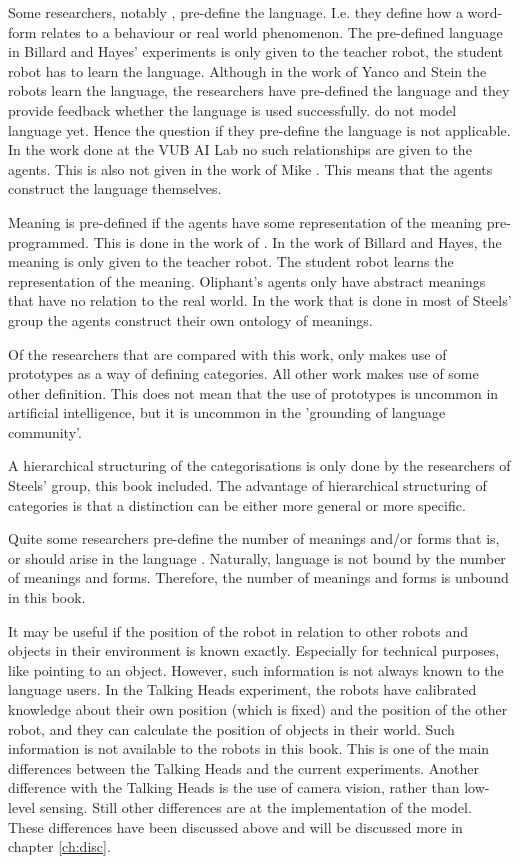 Some researchers, notably \citep{billard:1997a,cangelosiparisi:1998,yancostein}, pre-define the language. I.e. they define how a word-form relates to a behaviour or real world phenomenon. The pre-defined language in Billard and Hayes' experiments is only given to the teacher robot, the student robot has to learn the language. Although in the work of Yanco and Stein the robots learn the language, the researchers have pre-defined the language and they provide feedback whether the language is used successfully. \citet{rosenstein:1998a} do not model language yet. Hence the question if they pre-define the language is not applicable. In the work done at the VUB AI Lab no such relationships are given to the agents. This is also not given in the work of Mike \citet{oliphant:1997}. This means that the agents construct the language themselves. 

Meaning is pre-defined if the agents have some representation of the meaning pre-programmed. This is done in the work of \citep{billard:1997a,oliphant:1997,yancostein}. In the work of Billard and Hayes, the meaning is only given to the teacher robot. The student robot learns the representation of the meaning. Oliphant's agents only have abstract meanings that have no relation to the real world. In the work that is done in most of Steels' group the agents construct their own ontology of meanings.

Of the researchers that are compared with this work, only \citet{rosenstein:1998a} makes use of prototypes as a way of defining categories. All other work makes use of some other definition. This does not mean that the use of prototypes is uncommon in artificial intelligence, but it is uncommon in the 'grounding of language community'.

A hierarchical structuring of the categorisations is only done by the researchers of Steels' group, this book included. The advantage of hierarchical structuring of categories is that a distinction can be either more general or more specific.

Quite some researchers pre-define the number of meanings and/or forms that is, or should arise in the language \citep{billard:1997a,cangelosiparisi:1998,oliphant:1997,yancostein}. Naturally, language is not bound by the number of meanings and forms. Therefore, the number of meanings and forms is unbound in this book.

It may be useful if the position of the robot in relation to other robots and objects in their environment is known exactly. Especially for technical purposes, like pointing to an object. However, such information is not always known to the language users. In the Talking Heads experiment, the robots have calibrated knowledge about their own position (which is fixed) and the position of the other robot, and they can calculate the position of objects in their world. Such information is not available to the robots in this book. This is one of the main differences between the Talking Heads and the current experiments. Another difference with the Talking Heads is the use of camera vision, rather than low-level sensing. Still other differences are at the implementation of the model. These differences have been discussed above and will be discussed more in chapter \ref{ch:disc}.

